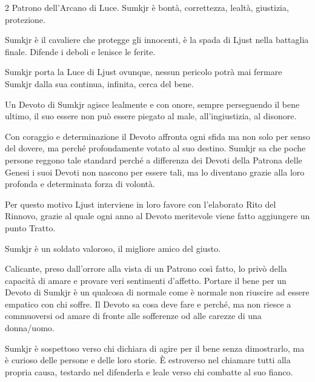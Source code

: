 \begin{multicols}{2}
Patrono dell'Arcano di Luce. Sumkjr è bontà, correttezza, lealtà, giustizia, protezione.

Sumkjr è il cavaliere che protegge gli innocenti, è la spada di Ljust nella battaglia finale. Difende i deboli e lenisce le ferite.

Sumkjr porta la Luce di Ljust ovunque, nessun pericolo potrà mai fermare Sumkjr dalla sua continua, infinita, cerca del bene.

Un Devoto di Sumkjr agisce lealmente e con onore, sempre perseguendo il bene ultimo, il suo essere non può essere piegato al male, all'ingiustizia, al disonore.

Con coraggio e determinazione il Devoto affronta ogni sfida ma non solo per senso del dovere, ma perché profondamente votato al suo destino. Sumkjr sa che poche persone reggono tale standard perché a differenza dei Devoti della Patrona delle Genesi i suoi Devoti non nascono per essere tali, ma lo diventano grazie alla loro profonda e determinata forza di volontà.

Per questo motivo Ljust interviene in loro favore con l'elaborato Rito del Rinnovo, grazie al quale ogni anno al Devoto meritevole viene fatto aggiungere un punto Tratto.

Sumkjr è un soldato valoroso, il migliore amico del giusto.

Calicante, preso dall'orrore alla vista di un Patrono così fatto, lo privò della capacità di amare e provare veri sentimenti d'affetto. Portare il bene per un Devoto di Sumkjr è un qualcosa di normale come è normale non riuscire ad essere empatico con chi soffre. Il Devoto sa cosa deve fare e perché, ma non riesce a commuoversi od amare di fronte alle sofferenze od alle carezze di una donna/uomo.

Sumkjr è sospettoso verso chi dichiara di agire per il bene senza dimostrarlo, ma è curioso delle persone e delle loro storie. È estroverso nel chiamare tutti alla propria causa, testardo nel difenderla e leale verso chi combatte al suo fianco.


\end{multicols}
